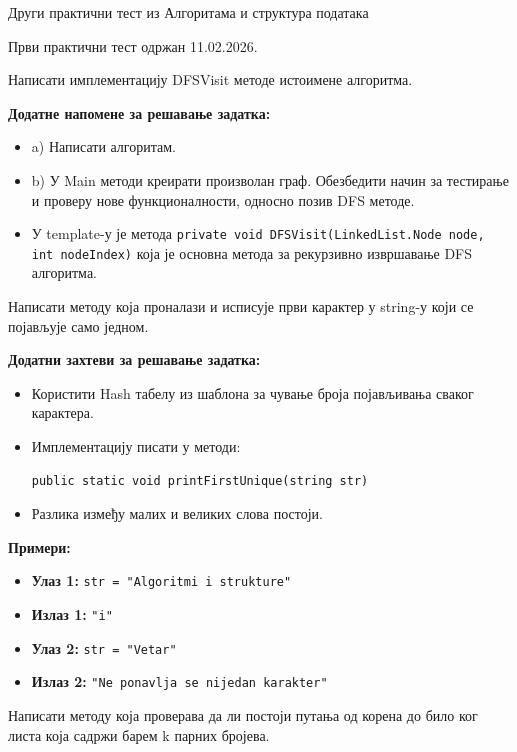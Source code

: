 
Други практични тест из Алгоритама и структура података

Први практични тест одржан 11.02.2026.

Написати имплементацију DFSVisit методе истоимене алгоритма.

\textbf{Додатне напомене за решавање задатка:}
\begin{itemize}
	\item a) Написати алгоритам.
	\item b) У Main методи креирати произволан граф. Обезбедити начин за тестирање и проверу нове функционалности, односно позив DFS методе.
	\item У template-у је метода \texttt{private void DFSVisit(LinkedList.Node node, int nodeIndex)} која је основна метода за рекурзивно извршавање DFS алгоритма.
\end{itemize}

Написати методу која проналази и исписује први карактер у string-у који се појављује само једном.

\textbf{Додатни захтеви за решавање задатка:}
\begin{itemize}
	\item Користити Hash табелу из шаблона за чување броја појављивања сваког карактера.
	\item Имплементацију писати у методи:
	\begin{Verbatim}[fontsize=\small]
public static void printFirstUnique(string str)
	\end{Verbatim}
	\item Разлика између малих и великих слова постоји.
\end{itemize}

\textbf{Примери:}
\begin{itemize}
	\item \textbf{Улаз 1:} \texttt{str = "Algoritmi i strukture"}
	\item \textbf{Излаз 1:} \texttt{"i"}
	\item \textbf{Улаз 2:} \texttt{str = "Vetar"}
	\item \textbf{Излаз 2:} \texttt{"Ne ponavlja se nijedan karakter"}
\end{itemize}

Написати методу која проверава да ли постоји путања од корена до било ког листа која садржи барем k парних бројева.

